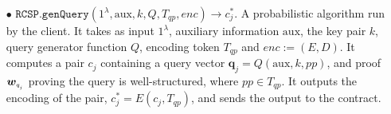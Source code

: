 \begin{definition}[RC-S-P Scheme]
\begin{itemize}

\


\item[$\bullet$] $\mathtt{RCSP}.\mathtt{genQuery}(1^\lambda, \text{aux},k,Q, T_{\scriptscriptstyle qp}, enc)\rightarrow c^{\scriptscriptstyle *}_{\scriptscriptstyle j}$. A probabilistic algorithm run by the client. It takes as input  $1^\lambda$,  auxiliary information $\text{aux}$,  the key pair $k$,   query generator  function $Q$, encoding token $T_{\scriptscriptstyle qp}$ and $enc:=(E,D)$.  It computes a pair $c_{\scriptscriptstyle j}$ containing a query vector $\bm{q}_{\scriptscriptstyle j}=Q( \text{aux},k,{pp})$,  and proof $\bm{w}_{\scriptscriptstyle q_{_{\scaleto{j}{\size}}}}$ proving the query is well-structured, where {$pp\in T_{\scriptscriptstyle qp}$}. It outputs the encoding of the pair, $c^{\scriptscriptstyle *}_{\scriptscriptstyle j}=E(c_{\scriptscriptstyle j},T_{\scriptscriptstyle qp})$, and sends the output to the contract. 




\end{itemize}
\end{definition}
